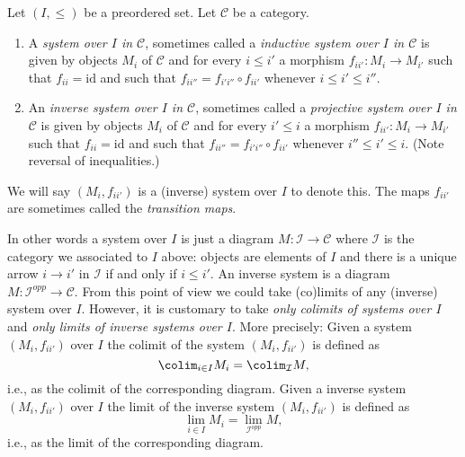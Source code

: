 \begin{definition}
\label{definition-system-over-poset}
Let $(I, \leq)$ be a preordered set. Let $\mathcal{C}$ be a category.
\begin{enumerate}
\item A {\it system over $I$ in $\mathcal{C}$}, sometimes called a
{\it inductive system over $I$ in $\mathcal{C}$} is given by
objects $M_i$ of $\mathcal{C}$ and for every $i \leq i'$ a
morphism $f_{ii'} : M_i \to M_{i'}$ such that $f_{ii}
= \text{id}$ and such that $f_{ii''} = f_{i'i''} \circ f_{i i'}$
whenever $i \leq i' \leq i''$.
\item An {\it inverse system over $I$ in $\mathcal{C}$},
sometimes called a {\it projective system over $I$ in $\mathcal{C}$}
is given by objects $M_i$ of $\mathcal{C}$ and for every $i' \leq i$ a
morphism $f_{ii'} : M_i \to M_{i'}$ such that $f_{ii}
= \text{id}$ and such that $f_{ii''} = f_{i'i''} \circ f_{i i'}$
whenever $i'' \leq i' \leq i$. (Note reversal of inequalities.)
\end{enumerate}
We will say $(M_i, f_{ii'})$ is a (inverse) system over $I$ to
denote this. The maps $f_{ii'}$ are sometimes
called the {\it transition maps}.
\end{definition}

\noindent
In other words a system over $I$ is just a diagram
$M : \mathcal{I} \to \mathcal{C}$ where $\mathcal{I}$ is the category
we associated to $I$ above: objects are elements of $I$ and
there is a unique arrow $i \to i'$ in $\mathcal{I}$ if and only if $i \leq i'$.
An inverse system is a diagram $M : \mathcal{I}^{opp} \to \mathcal{C}$.
From this point of view we could take (co)limits of any (inverse)
system over $I$. However, it is customary to take
{\it only colimits of systems over $I$} and
{\it only limits of inverse systems over $I$}.
More precisely: Given a system $(M_i, f_{ii'})$
over $I$ the colimit of the system
$(M_i, f_{ii'})$ is defined as
$$
\colim_{i \in I} M_i = \colim_\mathcal{I} M,
$$
i.e., as the colimit of the corresponding diagram.
Given a inverse system $(M_i, f_{ii'})$ over $I$ the limit
of the inverse system $(M_i, f_{ii'})$ is defined as
$$
\lim_{i \in I} M_i = \lim_{\mathcal{I}^{opp}} M,
$$
i.e., as the limit of the corresponding diagram.

